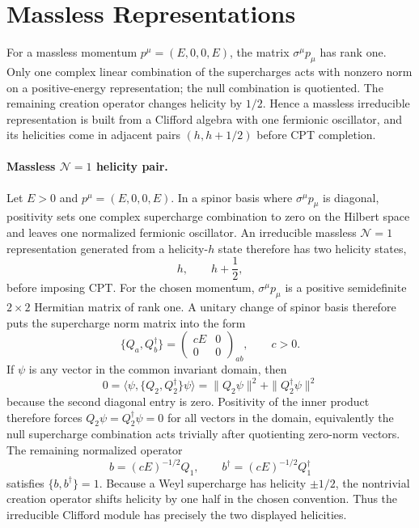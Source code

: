 \section{Massless Representations}

For a massless momentum \(p^\mu=(E,0,0,E)\), the matrix
\(\sigma^\mu p_\mu\) has rank one.  Only one complex linear combination of
the supercharges acts with nonzero norm on a positive-energy representation;
the null combination is quotiented.  The remaining creation operator changes
helicity by \(1/2\).  Hence a massless irreducible representation is built
from a Clifford algebra with one fermionic oscillator, and its helicities
come in adjacent pairs \((h,h+1/2)\) before CPT completion.

\paragraph{Massless \(\mathcal N=1\) helicity pair.}
Let \(E>0\) and \(p^\mu=(E,0,0,E)\).  In a spinor basis where
\(\sigma^\mu p_\mu\) is diagonal, positivity sets one complex supercharge
combination to zero on the Hilbert space and leaves one normalized
fermionic oscillator.  An irreducible massless \(\mathcal N=1\)
representation generated from a helicity-\(h\) state therefore has two
helicity states,
\[
  h,\qquad h+\frac12,
\]
before imposing CPT.
For the chosen momentum, \(\sigma^\mu p_\mu\) is a positive semidefinite
\(2\times2\) Hermitian matrix of rank one.  A unitary change of spinor basis
therefore puts the supercharge norm matrix into the form
\[
  \{Q_a,Q_b^\dagger\}
  =
  \begin{pmatrix}
    cE&0\\
    0&0
  \end{pmatrix}_{ab},
  \qquad c>0 .
\]
If \(\psi\) is any vector in the common invariant domain, then
\[
  0
  =
  \langle \psi,\{Q_2,Q_2^\dagger\}\psi\rangle
  =
  \|Q_2\psi\|^2+\|Q_2^\dagger\psi\|^2
\]
because the second diagonal entry is zero.  Positivity of the inner product
therefore forces \(Q_2\psi=Q_2^\dagger\psi=0\) for all vectors in the
domain, equivalently the null supercharge combination acts trivially after
quotienting zero-norm vectors.  The remaining normalized operator
\[
  b=(cE)^{-1/2}Q_1,\qquad b^\dagger=(cE)^{-1/2}Q_1^\dagger
\]
satisfies \(\{b,b^\dagger\}=1\).  Because a Weyl supercharge has helicity
\(\pm1/2\), the nontrivial creation operator shifts helicity by one half in
the chosen convention.  Thus the irreducible Clifford module has precisely
the two displayed helicities.

